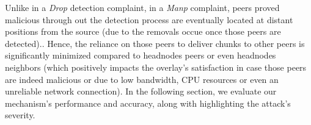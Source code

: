 Unlike in a \textit{Drop} detection complaint, in a \textit{Manp} complaint, peers proved malicious through out the detection process are eventually located at distant positions from the source (due to the removals occue once those peers are detected)..
Hence, the reliance on those peers to deliver chunks to other peers is significantly minimized compared to headnodes peers or even headnodes neighbors (which positively impacts the overlay's satisfaction in case those peers are indeed malicious or due to low bandwidth, CPU resources or even an unreliable network connection).
In the following section, we evaluate our mechanism's performance and accuracy, along with highlighting the attack's severity.



